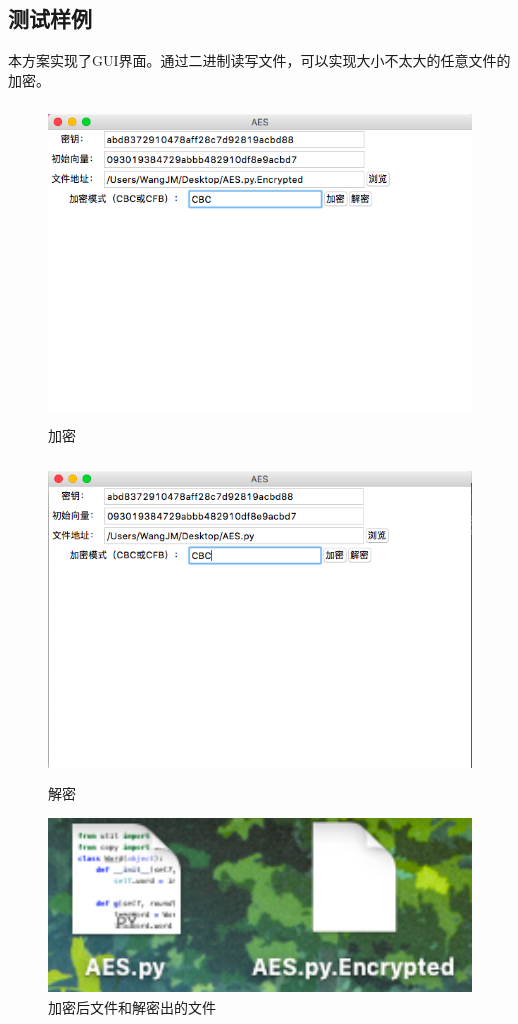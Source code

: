 \documentclass[11pt]{ctexart}
\begin{document}
\subsection{测试样例}
本方案实现了GUI界面。通过二进制读写文件，可以实现大小不太大的任意文件的加密。
\begin{figure}[htbp]
\centering
\includegraphics[height=8.40cm,width=11.98cm]{encrypt.png}
\caption{加密}
\label{encrypt}
\end{figure}
\begin{figure}[htbp]
\centering
\includegraphics[height=8.44cm,width=12.04cm]{decrypt.png}
\caption{解密}
\label{decrypt}
\end{figure}
\begin{figure}[htbp]
\centering
\includegraphics[height=4.65cm,width=11.35cm]{result.png}
\caption{加密后文件和解密出的文件}
\label{result}
\end{figure}
\newpage{}
\end{document}
